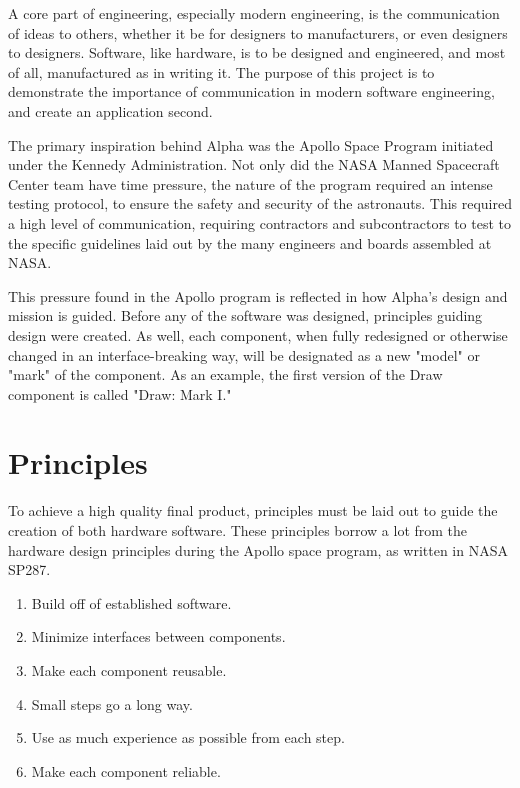 A core part of engineering, especially modern engineering, is the communication
of ideas to others, whether it be for designers to manufacturers, or even
designers to designers. Software, like hardware, is to be designed and
engineered, and most of all, manufactured as in writing it. The purpose of this
project is to demonstrate the importance of communication in modern software
engineering, and create an application second.

The primary inspiration behind Alpha was the Apollo Space Program initiated
under the Kennedy Administration. Not only did the NASA Manned Spacecraft Center
team have time pressure, the nature of the program required an intense testing
protocol, to ensure the safety and security of the astronauts. This required a
high level of communication, requiring contractors and subcontractors to test to
the specific guidelines laid out by the many engineers and boards assembled at
NASA.

This pressure found in the Apollo program is reflected in how Alpha's design and
mission is guided. Before any of the software was designed, principles guiding
design were created. As well, each component, when fully redesigned or otherwise
changed in an interface-breaking way, will be designated as a new "model" or
"mark" of the component. As an example, the first version of the Draw component
is called "Draw: Mark I."

\section{Principles}

To achieve a high quality final product, principles must be laid out to guide
the creation of both hardware software. These principles borrow a lot from the
hardware design principles during the Apollo space program, as written in NASA
SP287.

\begin{enumerate}
    \item Build off of established software.
    \item Minimize interfaces between components.
    \item Make each component reusable.
    \item Small steps go a long way.
    \item Use as much experience as possible from each step.
    \item Make each component reliable.
\end{enumerate}

